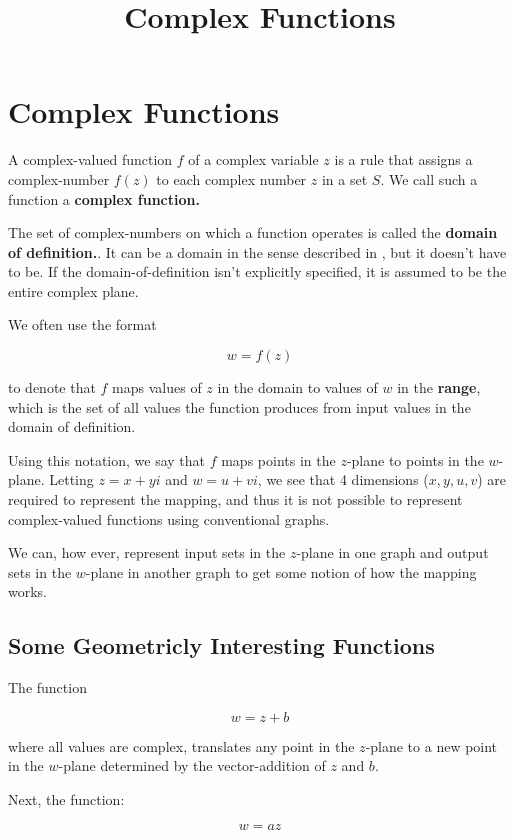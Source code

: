 \documentclass{article}
\title{Complex Functions}
\begin{document}
\section{Complex Functions}

\begin{definition}
A complex-valued function $f$ of a complex variable $z$ is a rule that assigns a \@{complex-number} $f(z)$ to each complex number $z$ in a set $S$. We call such a \@{function} a \textbf{complex function.}
\end{definition}

The set of \@{complex-numbers} on which a function operates is called the \textbf{domain of definition.}. It can be a domain in the sense described in , but it doesn't have to be. If the \@{domain-of-definition} isn't explicitly specified, it is assumed to be the entire complex plane.

We often use the format

\[ w = f(z) \]

to denote that $f$ maps values of $z$ in the domain to values of $w$ in the \textbf{range}, which is the set of all values the function produces from input values in the domain of definition.

Using this notation, we say that $f$ maps points in the $z$-plane to points in the $w$-plane. Letting $z = x + yi$ and $w = u + vi$, we see that 4 dimensions ($x,y,u,v$) are required to represent the mapping, and thus it is not possible to represent complex-valued functions using conventional graphs.

We can, how ever, represent input sets in the $z$-plane in one graph and output sets in the $w$-plane in another graph to get some notion of how the mapping works.

\subsection{Some Geometricly Interesting Functions}

The function

\[ w = z + b \]

where all values are complex, translates any point in the $z$-plane to a new point in the $w$-plane determined by the \@{vector-addition} of $z$ and $b$.

Next, the function:

\[ w = az \]
\end{document}

